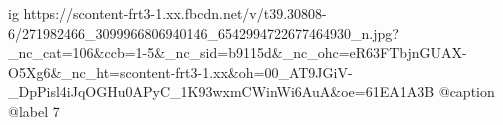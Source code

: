  
 
 
 
 

\ifcmt
  ig https://scontent-frt3-1.xx.fbcdn.net/v/t39.30808-6/271982466_3099966806940146_6542994722677464930_n.jpg?_nc_cat=106&ccb=1-5&_nc_sid=b9115d&_nc_ohc=eR63FTbjnGUAX-O5Xg6&_nc_ht=scontent-frt3-1.xx&oh=00_AT9JGiV-_DpPisl4iJqOGHu0APyC_1K93wxmCWinWi6AuA&oe=61EA1A3B
  @caption @label 7
\fi
